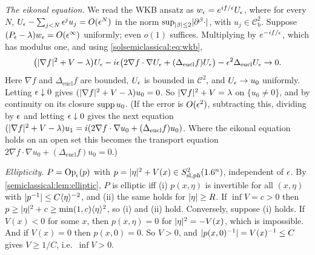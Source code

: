 \emph{The eikonal equation.} We read the WKB ansatz as $w_\epsilon=e^{if/\epsilon}U_\epsilon$, where for every
$N$, $U_\epsilon-\sum_{j<N}\epsilon^ju_j=O(\epsilon^N)$ in the norm $\sup_{\lvert \beta\rvert\le2}\lvert \partial^\beta\cdot\rvert$, with
$u_j\in\mathcal C^2_{\mathrm b}$. Suppose $(P_\epsilon-\lambda)w_\epsilon=O(\epsilon^\infty)$ uniformly; even $o(1)$
suffices. Multiplying by $e^{-if/\epsilon}$, which has modulus one, and using
\eqref{solsemiclassical:eq:wkb},
\begin{equation*}
\big(\lvert \nabla f\rvert^2+V-\lambda\big)U_\epsilon-i\epsilon\big(2\nabla f\cdot\nabla U_\epsilon+(\Delta_{\mathrm{eucl}}f)U_\epsilon\big)-\epsilon^2\Delta_{\mathrm{eucl}}U_\epsilon\to0 .
\end{equation*}
Here $\nabla f$ and $\Delta_{\mathrm{eucl}}f$ are bounded, $U_\epsilon$ is bounded in $\mathcal C^2$, and
$U_\epsilon\to u_0$ uniformly. Letting $\epsilon\downarrow0$ gives $(\lvert \nabla f\rvert^2+V-\lambda)u_0=0$. So
$\lvert \nabla f\rvert^2+V=\lambda$ on $\{u_0\ne0\}$, and by continuity on its closure $\operatorname{supp} u_0$. (If the
error is $O(\epsilon^2)$, subtracting this, dividing by $\epsilon$ and letting $\epsilon\downarrow0$ gives the
next equation
$(\lvert \nabla f\rvert^2+V-\lambda)u_1=i(2\nabla f\cdot\nabla u_0+(\Delta_{\mathrm{eucl}}f)u_0)$. Where the eikonal
equation holds on an open set this becomes the transport equation
$2\nabla f\cdot\nabla u_0+(\Delta_{\mathrm{eucl}}f)u_0=0$.)

\emph{Ellipticity.} $P=\operatorname{Op}_\epsilon(p)$ with $p=\lvert \eta\rvert^2+V(x)\in S^{2}_{\mathrm{sl,ph}}(1.6^n)$, independent of $\epsilon$. By
\cref{semiclassical:lem:elliptic}, $P$ is elliptic iff (i) $p(x,\eta)$ is invertible for all
$(x,\eta)$ with $\lvert p^{-1}\rvert\le C\langle \eta\rangle^{-2}$, and (ii) the same holds for $\lvert \eta\rvert\ge R$. If $\inf V=c>0$
then $p\ge\lvert \eta\rvert^2+c\ge\min(1,c)\langle \eta\rangle^2$, so (i) and (ii) hold. Conversely, suppose (i) holds. If
$V(x)<0$ for some $x$, then $p(x,\eta)=0$ for $\lvert \eta\rvert^2=-V(x)$, which is impossible. And if $V(x)=0$
then $p(x,0)=0$. So $V>0$, and $\lvert p(x,0)^{-1}\rvert=V(x)^{-1}\le C$ gives $V\ge1/C$, i.e.\ $\inf V>0$.

